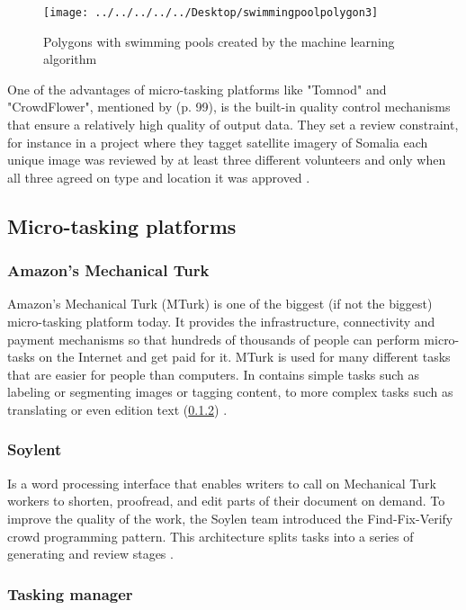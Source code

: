 \begin{figure}[H]
	\centering
	\texttt{[image: ../../../../../Desktop/swimmingpoolpolygon3]}
	\caption{Polygons with swimming pools created by the machine learning algorithm \citep{Nikki2016}}
	\label{fig:swimmingpoolpolygon3}
\end{figure}

One of the advantages of micro-tasking platforms like "Tomnod" and "CrowdFlower", mentioned by \cite{Meier2013} (p. 99), is the built-in quality control mechanisms that ensure a relatively high quality of output data. They set a review constraint, for instance in a project where they tagget satellite imagery of Somalia each unique image was reviewed by at least three different volunteers and only when all three agreed on type and location it was approved . 

\subsection{Micro-tasking platforms}
\subsubsection[MTurk]{Amazon's Mechanical Turk}
Amazon's Mechanical Turk (MTurk) is one of the biggest (if not the biggest) micro-tasking platform today. It provides the infrastructure, connectivity and payment mechanisms so that hundreds of thousands of people can perform micro-tasks on the Internet and get paid for it. MTurk is used for many different tasks that are easier for people than computers. In contains simple tasks such as labeling or segmenting images or tagging content, to more complex tasks such as translating or even edition text (\ref{sec:soylent}) \citep{Franklin2011}.  

\subsubsection{Soylent}\label{sec:soylent}
Is a word processing interface that enables writers to call on Mechanical Turk workers to shorten, proofread, and edit parts of their document on demand. To improve the quality of the work, the Soylen team introduced the Find-Fix-Verify crowd programming pattern. This architecture splits tasks into a series of generating and review stages \citep{Bernstein2015a}. 

\subsubsection{Tasking manager}
